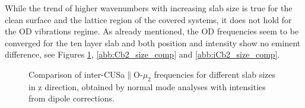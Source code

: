 \documentclass[11pt,DIV=13,BCOR=5mm,a4paper,headinclude]{scrbook}
\begin{document}
While the trend of higher wavenumbers with increasing slab size is true for the clean surface and the lattice region of the covered systems, it does not hold for the OD vibrations regime.
As already mentioned, the OD frequencies seem to be converged for the ten layer slab and both position and intensity show no eminent difference, see Figures \ref{abb:iCa2_size_comp}, \ref{abb:Cb2_size_comp} and \ref{abb:iCb2_size_comp}.
\begin{figure}[!h]
    \centering
             \quad
             \quad
             \caption{Comparison of inter-CUSa$\parallel$O-$\mu_2$ frequencies for different slab sizes in z direction, obtained by normal mode analyses with intensities from dipole corrections.}
            \label{abb:iCa2_size_comp}
\end{figure}
\end{document}
